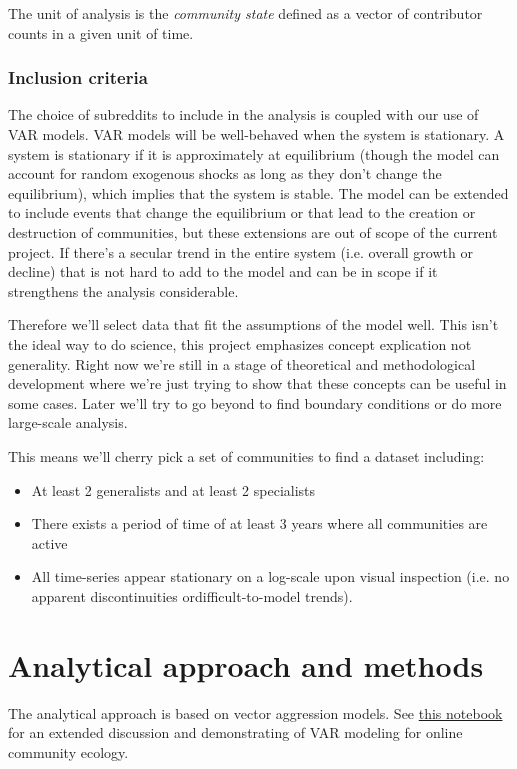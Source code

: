 \documentclass[12pt]{memoir}
\begin{document}
The unit of analysis is the \emph{community state} defined as a vector of contributor counts in a given unit of time. 

\subsubsection{Inclusion criteria}
The choice of subreddits to include in the analysis is coupled with our use of VAR models.  VAR models will be well-behaved when the system is stationary.  A system is stationary if it is approximately at equilibrium (though the model can account for random exogenous shocks as long as they don't change the equilibrium), which implies that the system is stable.  The model can be extended to include events that change the equilibrium or that lead to the creation or destruction of communities, but these extensions are out of scope of the current project.  If there's a secular trend in the entire system (i.e. overall growth or decline) that is not hard to add to the model and can be in scope if it strengthens the analysis considerable. 

Therefore we'll select data that fit the assumptions of the model well.  This isn't the ideal way to do science, this project emphasizes concept explication not generality.  Right now we're still in a stage of theoretical and methodological development where we're just trying to show that these concepts can be useful in some cases. Later we'll try to go beyond to find boundary conditions or do more large-scale analysis. 

This means we'll cherry pick a set of communities to find a dataset including:

\begin{itemize}
\item At least 2 generalists and at least 2 specialists
\item There exists a period of time of at least 3 years where all communities are active
\item All time-series appear stationary on a log-scale upon visual inspection (i.e. no apparent discontinuities ordifficult-to-model trends).
\end{itemize}


\section{Analytical approach and methods}

The analytical approach is based on vector aggression models.  See \href{https://teblunthuis.cc/outgoing/private/notebook_share/notebook-exported.html}{this notebook} for an extended discussion and demonstrating of VAR modeling for online community ecology.
\end{document}
